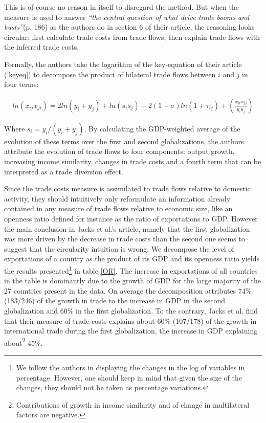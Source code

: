 \documentclass{article}
\begin{document}
This is of course no reason in itself to disregard the method.
But when the measure is used to answer \emph{``the central
question of what drive trade booms and busts''}(p. 186) as the
authors do in section 6 of their article, the reasoning looks
circular: first calculate trade costs from trade flows, then
explain trade flows with the inferred trade costs.

Formally, the authors take the logarithm of the key-equation of
their article (\ref{keyeq}) to decompose the product of
bilateral trade flows between $i$ and $j$ in four terms:

\begin{eqnarray}
ln (x_{ij}x_{ji})= 2 ln(y_i + y_j)+ ln (s_i s_j) + 2(1-\sigma)ln(1+\tau_{ij})+ \left(\frac{x_{ii} x_{jj}}{y_i y_j}\right)
\end{eqnarray}

Where $s_i=y_i/(y_i+y_j)$. By calculating the GDP-weighted
average of the evolution of these terms over the first and
second globalizations, the authors attribute the evolution of
trade flows to four components: output growth, increasing
income similarity, changes in trade costs and a fourth term
that can be interpreted as a trade diversion effect.

Since the trade costs measure is assimilated to trade flows
relative to domestic activity, they should intuitively only
reformulate an information already contained in any measure of
trade flows relative to economic size, like an openness ratio
defined for instance as the ratio of exportations to GDP.
However the main conclusion in Jacks et al.'s article, namely
that the first globalization was more driven by the decrease in
trade costs than the second one seems to suggest that the
circularity intuition is wrong. We decompose the level of
exportations of a country as the product of its GDP and its
openness ratio yields the results presented\footnote{We follow
the authors in displaying the changes in the log of variables
in percentage. However, one should keep in mind that given the
size of the changes, they should not be taken as percentage
variations.} in table \ref{OR}. The increase in exportations of
all countries in the table is dominantly due to the growth of
GDP for the large majority of the 27 countries present in the
data. On average the decomposition attributes 74\% (183/246) of
the growth in trade to the increase in GDP in the second
globalization and 60\% in the first globalization. To the
contrary, Jacks et al. find that their measure of trade costs
explains about 60\% (107/178) of the growth in international
trade during the first globalization, the increase in GDP
explaining about\footnote{Contributions of growth in income
similarity and of change in multilateral factors are negative.}
45\%.
\end{document}
